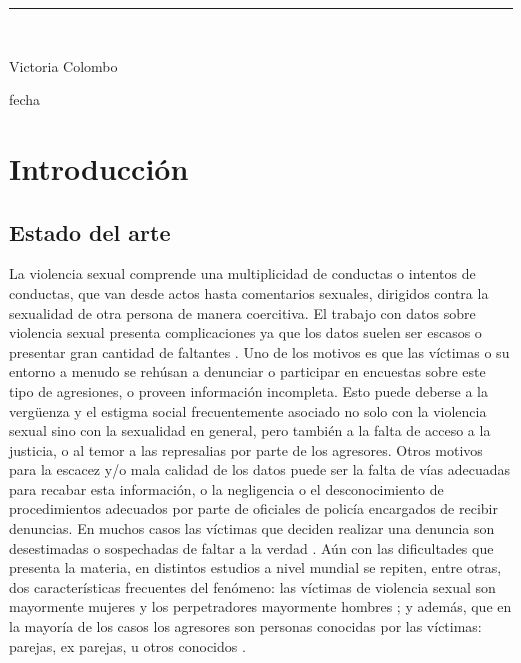 \documentclass[10 pt]{article}
\begin{document}
\begin{titlepage}
\begin{center}
    
    \vspace*{0.3in}
    \rule{80mm}{0.1mm}\\
    \vspace*{0.1in}
    \begin{large}
    Victoria Colombo
    
    \vspace*{0.3in}
    
    \vspace*{0.1in}fecha
    \end{large}
    \end{center}
    
    \end{titlepage}

\newpage

\begin{abstract}

\end{abstract}
\newpage
\section*{Introducción}\label{intro}

\subsection*{Estado del arte}

La violencia sexual comprende una multiplicidad de conductas o intentos de conductas, que van desde actos hasta comentarios sexuales, dirigidos contra la sexualidad de otra persona de manera coercitiva. El trabajo con datos sobre violencia sexual presenta complicaciones ya que los datos suelen ser escasos o presentar gran cantidad de faltantes \citetext{\citealp[p.~150]{ferris2002world}}. Uno de los motivos es que las víctimas o su entorno a menudo se rehúsan a denunciar o participar en encuestas sobre este tipo de agresiones, o proveen información incompleta. Esto puede deberse a la vergüenza y el estigma social frecuentemente asociado no solo con la violencia sexual sino con la sexualidad en general, pero también a la falta de acceso a la justicia, o al temor a las represalias por parte de los agresores. Otros motivos para la escacez y/o mala calidad de los datos puede ser la falta de vías adecuadas para recabar esta información, o la negligencia o el desconocimiento de procedimientos adecuados por parte de oficiales de policía encargados de recibir denuncias. En muchos casos las víctimas que deciden realizar una denuncia son desestimadas o sospechadas de faltar a la verdad \citep*{murphy2022unfounded}. Aún con las dificultades que presenta la materia, en distintos estudios a nivel mundial se repiten, entre otras, dos características frecuentes del fenómeno: las víctimas de violencia sexual son mayormente mujeres y los perpetradores mayormente hombres \citetext{\citealp[p.~149]{ferris2002world}; \citealp[p.~15]{contreras2016violencia}}; y además, que en la mayoría de los casos los agresores son personas conocidas por las víctimas: parejas, ex parejas, u otros conocidos \citetext*{\citealp[p.~9]{garcia2005multi},\citealp[p.~22]{unicef2018analisis}, \citealp[p.~151]{ferris2002world}}.
\end{document}
